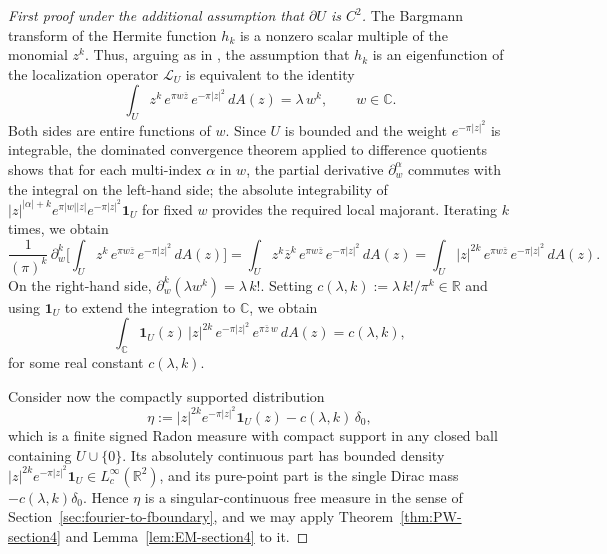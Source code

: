 \documentclass[a4paper,11pt,reqno]{amsart}
\numberwithin{equation}{section}
\theoremstyle{plain} %
\theoremstyle{definition} %
\theoremstyle{remark}
\newcommand{\R}{\mathbb{R}}
\newcommand{\C}{\mathbb{C}}
\begin{document}
\begin{proof}[First proof under the additional assumption that $\partial U$ is $C^2$]
The Bargmann transform of the Hermite function $h_k$ is a nonzero scalar
multiple of the monomial $z^k$. Thus, arguing as in
\cite{Abreu-Doerfler}, the assumption that $h_k$ is an eigenfunction of
the localization operator $\mathcal{L}_U$ is equivalent to the identity
\[
\int_U z^k\, e^{\pi w\overline{z}}\, e^{-\pi |z|^2}\,dA(z)
=\lambda\, w^k,
\qquad w\in \C.
\]
Both sides are entire functions of $w$. Since $U$ is bounded and the
weight $e^{-\pi|z|^2}$ is integrable, the dominated convergence
theorem applied to difference quotients shows that for each
multi-index $\alpha$ in $w$, the partial derivative
$\partial_w^\alpha$ commutes with the integral on the left-hand side;
the absolute integrability of $|z|^{|\alpha|+k} e^{\pi
|w||z|}e^{-\pi|z|^2}\mathbf{1}_U$ for fixed $w$ provides the required
local majorant. Iterating $k$ times, we obtain
\[
\frac{1}{(\pi)^k}\,\partial_w^k
\Big[\int_U z^k\, e^{\pi w\overline{z}}\, e^{-\pi |z|^2}\,dA(z)\Big]
=\int_U z^k\overline{z}^k\, e^{\pi w\overline{z}}\, e^{-\pi |z|^2}\,dA(z)
=\int_U |z|^{2k}\, e^{\pi w\overline{z}}\, e^{-\pi |z|^2}\,dA(z).
\]
On the right-hand side, $\partial_w^k(\lambda w^k)=\lambda\,k!$.
Setting $c(\lambda,k):=\lambda\,k!/\pi^k\in\R$ and using
$\mathbf{1}_U$ to extend the integration to $\C$, we obtain
\begin{equation}\label{eq:fourier-delta}
\int_{\C} \mathbf{1}_U(z)\,|z|^{2k}\,e^{-\pi |z|^2}\, e^{\pi \overline{z}\, w}\,dA(z)
=c(\lambda,k),
\end{equation}
for some real constant $c(\lambda,k)$.

Consider now the compactly supported distribution
\begin{equation}\label{eq:eta-def-section4}
\eta:=|z|^{2k}e^{-\pi |z|^2}\mathbf{1}_U(z)-c(\lambda,k)\,\delta_0,
\end{equation}
which is a finite signed Radon measure with compact support in any closed
ball containing $U\cup\{0\}$. Its absolutely continuous part has bounded
density $|z|^{2k}e^{-\pi|z|^2}\mathbf{1}_U\in L^\infty_c(\R^2)$, and its
pure-point part is the single Dirac mass $-c(\lambda,k)\delta_0$. Hence
$\eta$ is a singular-continuous free measure in the sense of
Section~\ref{sec:fourier-to-fboundary}, and we may apply
Theorem~\ref{thm:PW-section4} and Lemma~\ref{lem:EM-section4} to it.


\end{proof}
\end{document}
